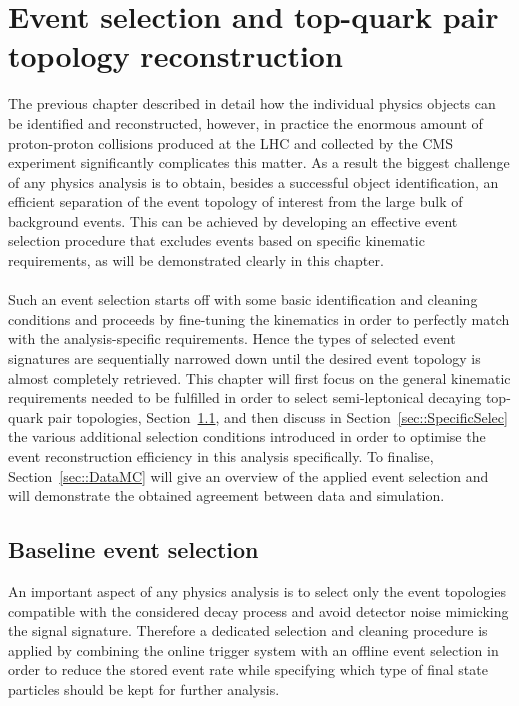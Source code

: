 \chapter{Event selection and top-quark pair topology reconstruction} \label{chp:labelTitle}

The previous chapter described in detail how the individual physics objects can be identified and reconstructed, however, in practice the enormous amount of proton-proton collisions produced at the LHC and collected by the CMS experiment significantly complicates this matter.
As a result the biggest challenge of any physics analysis is to obtain, besides a successful object identification, an efficient separation of the event topology of interest from the large bulk of background events.
This can be achieved by developing an effective event selection procedure that excludes events based on specific kinematic requirements, as will be demonstrated clearly in this chapter.
\\
\\
Such an event selection starts off with some basic identification and cleaning conditions and proceeds by fine-tuning the kinematics in order to perfectly match with the analysis-specific requirements. Hence the types of selected event signatures are sequentially narrowed down until the desired event topology is almost completely retrieved. This chapter will first focus on the general kinematic requirements needed to be fulfilled in order to select semi-leptonical decaying top-quark pair topologies, Section~\ref{sec::MainSelec}, and then discuss in Section~\ref{sec::SpecificSelec} the various additional selection conditions introduced in order to optimise the event reconstruction efficiency in this analysis specifically.
To finalise, Section~\ref{sec::DataMC} will give an overview of the applied event selection and will demonstrate the obtained agreement between data and simulation.

\section{Baseline event selection}\label{sec::MainSelec}
An important aspect of any physics analysis is to select only the event topologies compatible with the considered decay process and avoid detector noise mimicking the signal signature. 
Therefore a dedicated selection and cleaning procedure is applied by combining the online trigger system with an offline event selection in order to reduce the stored event rate while specifying which type of final state particles should be kept for further analysis.


